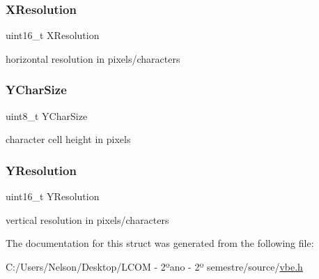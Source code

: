 \subsubsection{\texorpdfstring{X\+Resolution}{XResolution}}
{\footnotesize\ttfamily uint16\+\_\+t X\+Resolution}



horizontal resolution in pixels/characters 

\mbox{\label{struct____attribute_____a330f00ebd49dccd2325d43cdbd646f09}} 
\subsubsection{\texorpdfstring{Y\+Char\+Size}{YCharSize}}
{\footnotesize\ttfamily uint8\+\_\+t Y\+Char\+Size}



character cell height in pixels 

\mbox{\label{struct____attribute_____afa8aba2156994750d500f85d0f8425cb}} 
\subsubsection{\texorpdfstring{Y\+Resolution}{YResolution}}
{\footnotesize\ttfamily uint16\+\_\+t Y\+Resolution}



vertical resolution in pixels/characters 



The documentation for this struct was generated from the following file\+:\begin{DoxyCompactItemize}
\item 
C\+:/\+Users/\+Nelson/\+Desktop/\+L\+C\+O\+M -\/ 2ºano -\/ 2º semestre/source/\hyperlink{vbe_8h}{vbe.\+h}\end{DoxyCompactItemize}
